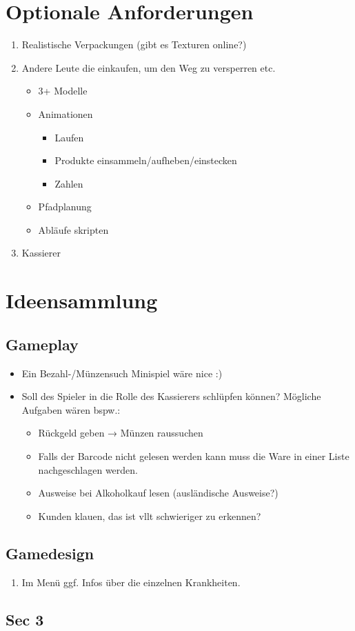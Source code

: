 \documentclass[a4paper, 11pt]{scrartcl}
\begin{document}
\section{Optionale Anforderungen}
\begin{enumerate}
    \item Realistische Verpackungen (gibt es Texturen online?)
    \item Andere Leute die einkaufen, um den Weg zu versperren etc.
    \begin{itemize}
        \item 3+ Modelle
        \item Animationen
        \begin{itemize}
            \item Laufen
            \item Produkte einsammeln/aufheben/einstecken
            \item Zahlen
        \end{itemize}
        \item Pfadplanung
        \item Abläufe skripten
    \end{itemize}
    \item Kassierer
\end{enumerate}



\section{Ideensammlung}
\subsection{Gameplay}
\begin{itemize}
    \item Ein Bezahl-/Münzensuch Minispiel wäre nice :)
    \item Soll des Spieler in die Rolle des Kassierers schlüpfen können?
    Mögliche Aufgaben wären bspw.:
    \begin{itemize}
        \item Rückgeld geben → Münzen raussuchen
        \item Falls der Barcode nicht gelesen werden kann muss die Ware
        in einer Liste nachgeschlagen werden.
        \item Ausweise bei Alkoholkauf lesen (ausländische Ausweise?)
        \item Kunden klauen, das ist vllt schwieriger zu erkennen?
    \end{itemize}
\end{itemize}

\subsection{Gamedesign}
\begin{enumerate}
    \item Im Menü ggf. Infos über die einzelnen Krankheiten.
\end{enumerate}


\subsection{Sec 3}
\end{document}

